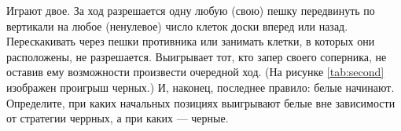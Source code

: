 \begin{multicols}{2}
\indent Играют двое. За ход разрешается одну любую (свою) пешку передвинуть по вертикали на любое (ненулевое) число клеток доски вперед или назад. Перескакивать через пешки противника или занимать клетки, в которых они расположены, не разрешается. Выигрывает тот, кто запер своего соперника, не оставив ему возможности произвести очередной ход. (На рисунке \ref{tab:second} изображен проигрыш черных.) И, наконец, последнее правило: белые начинают.
\indent Определите, при каких начальных позициях выигрывают белые вне зависимости от стратегии черрных, а при каких --- черные.\\[2mm]
\end{multicols}
